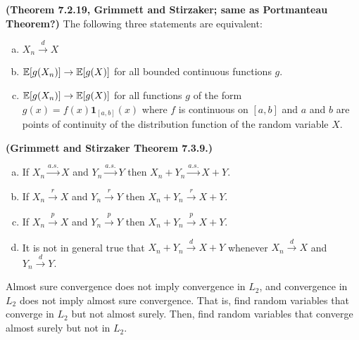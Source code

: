 \begin{theorem}\textbf{(Theorem 7.2.19, Grimmett and Stirzaker; same as Portmanteau Theorem?)} The following three statements are equivalent:

\begin{enumerate}[(a)]

\item \(X_n \xrightarrow{d} X\)

\item \(\mathbb{E}[g(X_n)] \to \mathbb{E}[g(X)]\) for all bounded continuous functions \(g\).

\item \(\mathbb{E}[g(X_n)] \to \mathbb{E}[g(X)]\) for all functions \(g\) of the form \(g(x) = f(x) \boldsymbol{1}_{[a, b]}(x)\) where \(f\) is continuous on \([a, b]\) and \(a\) and \(b\) are points of continuity of the distribution function of the random variable \(X\). 

\end{enumerate}
\end{theorem}

\begin{theorem}\textbf{(Grimmett and Stirzaker Theorem 7.3.9.)} 
\begin{enumerate}[(a)]

\item If \(X_n \xrightarrow{a.s.} X\) and \(Y_n \xrightarrow{a.s.} Y\) then \(X_n + Y_n \xrightarrow{a.s.} X + Y\).

\item If \(X_n \xrightarrow{r} X\) and \(Y_n \xrightarrow{r} Y\) then \(X_n + Y_n \xrightarrow{r} X + Y\).

\item If \(X_n \xrightarrow{p} X\) and \(Y_n \xrightarrow{p} Y\) then \(X_n + Y_n \xrightarrow{p} X + Y\).

\item It is not in general true that  \(X_n + Y_n \xrightarrow{d} X + Y\) whenever  \(X_n \xrightarrow{d} X\) and \(Y_n \xrightarrow{d} Y\).

\end{enumerate}
\end{theorem}

\begin{proposition}

Almost sure convergence does not imply convergence in $L_{2}$, and convergence in $L_{2}$ does not imply almost sure convergence.  That is, find random variables that converge in $L_{2}$ but not almost surely.  Then, find random variables that converge almost surely but not in $L_{2}$.
\end{proposition}

